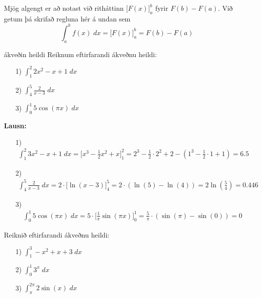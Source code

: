 \begin{ath}
Mjög algengt er að notast við ritháttinn $\displaystyle \Biggl[F(x)\Biggr]_{a}^{b}$ fyrir $F(b) - F(a)$. Við getum þá skrifað regluna hér á undan sem
$$
\int_{a}^{b}f(x)\;dx = \Biggl[F(x)\Biggr]_{a}^{b} = F(b) - F(a)
$$
\end{ath}

\begin{syn}{ákveðin heildi}
Reiknum eftirfarandi ákveðnu heildi:
\begin{itemize}
\item[1)] $\displaystyle \int_{1}^{2} 2x^{2}-x+1 \; dx$

\item[2)] $\displaystyle \int_{4}^{5} \frac{2}{x-3} \; dx$

\item[3)] $\displaystyle \int_{0}^{1} 5\cos(\pi x) \; dx$
\end{itemize}

\vspace{2mm}

{\bf Lausn:}
\begin{itemize}
\item[1)]
\begin{align*}
\int_{1}^{2} 3x^{2}-x+1 \; dx = \Biggl[x^{3}-\frac{1}{2}x^{2}+x\Biggr]_{1}^{2} = 2^{3}-\frac{1}{2} \cdot 2^{2}+2 - \left(1^{3}-\frac{1}{2} \cdot 1 + 1\right) = 6.5
\end{align*}
\item[2)]
\begin{align*}
\int_{4}^{5} \frac{2}{x-3} \; dx = 2\cdot\Biggl[\ln(x-3)\Biggr]_{4}^{5} = 2\cdot\left(\ln(5)-\ln(4)\right) = 2\ln\left(\frac{5}{4}\right) = 0.446
\end{align*}
\item[3)]
\begin{align*}
\int_{0}^{1} 5\cos(\pi x) \; dx = 5\cdot\Biggl[\frac{1}{\pi}\sin(\pi x)\Biggr]_{0}^{1} = \frac{5}{\pi}\cdot\left(\sin(\pi)-\sin(0)\right) = 0
\end{align*}
\end{itemize}
\end{syn}

\begin{æd}
Reiknið eftirfarandi ákveðnu heildi:
\begin{itemize}
\item[1)] $\displaystyle \int_{1}^{3} -x^{2}+x+3 \; dx$

\item[2)] $\displaystyle \int_{0}^{1} 3^{x} \; dx$

\item[3)] $\displaystyle \int_{\pi}^{2\pi} 2\sin(x) \; dx$
\end{itemize}
\end{æd}

